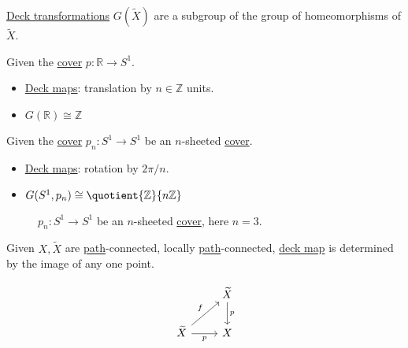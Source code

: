 \begin{eg}
	\hyperref[def:deck-transformation]{Deck transformations} \(G(\widetilde{X} )\) are a subgroup of the group of homeomorphisms of \(\widetilde{X} \).
\end{eg}

\begin{eg}
	Given the \hyperref[def:covering-map]{cover} \(p\colon \mathbb{R} \to S^1\).
	\begin{itemize}
		\item \hyperref[def:deck-transformation]{Deck maps}: translation by \(n\in \mathbb{Z} \) units.
		\item \(G(\mathbb{R} )\cong \mathbb{Z} \)
	\end{itemize}
\end{eg}

\begin{eg}
	Given the \hyperref[def:covering-map]{cover} \(p_{n}\colon S^{1}\to S^1\) be an \(n\)-sheeted \hyperref[def:covering-map]{cover}.
	\begin{itemize}
		\item \hyperref[def:deck-transformation]{Deck maps}: rotation by \(2\pi / n\).
		\item \(G(S^1, p_{n})\cong \quotient{\mathbb{Z} }{n \mathbb{Z} } \)
	\end{itemize}
	\begin{figure}[H]
		\centering
		\caption{\(p_{n} \colon S^1 \to S^1\) be an \(n\)-sheeted \hyperref[def:covering-map]{cover}, here \(n = 3\).}
		\label{fig:eg:lec17:N-sheeted-cover}
	\end{figure}
\end{eg}

\begin{exercise}\label{ex:lec17}
	Given \(X, \widetilde{X} \) are \hyperref[def:path]{path}-connected, locally \hyperref[def:path]{path}-connected, \hyperref[def:deck-transformation]{deck map} is determined by the image of any one point.
\end{exercise}
\begin{answer}
	\[
		\begin{tikzcd}
			& {\widetilde{X}} \\
			{\widetilde{X}} & X
			\arrow["f", from=2-1, to=1-2]
			\arrow["p"', from=2-1, to=2-2]
			\arrow["p", from=1-2, to=2-2]
		\end{tikzcd}
	\]
\end{answer}

